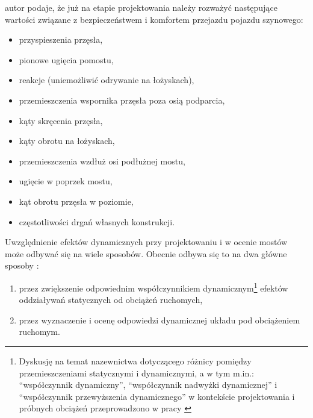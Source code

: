 \parencite{Niemierko} autor podaje, że już na etapie projektowania należy rozważyć następujące wartości związane z bezpieczeństwem i komfortem przejazdu pojazdu szynowego:
\begin{itemize}
	\item przyspieszenia przęsła,
	\item pionowe ugięcia pomostu,
	\item reakcje (uniemożliwić odrywanie na łożyskach),
	\item przemieszczenia wspornika przęsła poza osią podparcia,
	\item kąty skręcenia przęsła,
	\item kąty obrotu na łożyskach,
	\item przemieszczenia wzdłuż osi podłużnej mostu,
	\item ugięcie w poprzek mostu,
	\item kąt obrotu przęsła w poziomie,
	\item częstotliwości drgań własnych konstrukcji.
\end{itemize}

Uwzględnienie efektów dynamicznych przy projektowaniu i w ocenie mostów może odbywać się na wiele sposobów. Obecnie odbywa się to na dwa główne sposoby \parencite{Goicolea2008a}:
\begin{enumerate}
	\item przez zwiększenie odpowiednim współczynnikiem dynamicznym\footnote{
		Dyskusję na temat nazewnictwa dotyczącego różnicy pomiędzy przemieszczeniami statycznymi i dynamicznymi, a w tym m.in.: \enquote{współczynnik dynamiczny}, \enquote{współczynnik nadwyżki dynamicznej} i \enquote{współczynnik przewyższenia dynamicznego} w kontekście projektowania i próbnych obciążeń przeprowadzono w pracy \parencite{Poprawa2018}} 
	efektów oddziaływań statycznych od obciążeń ruchomych,
	\item przez wyznaczenie i ocenę odpowiedzi dynamicznej układu pod obciążeniem ruchomym.
\end{enumerate}

